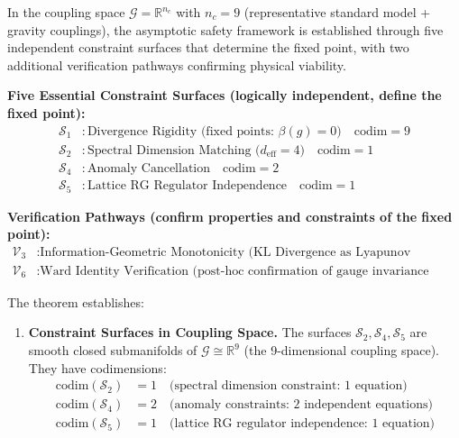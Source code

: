 \begin{theorem}
\label{thm:transversalityCompleteSixSurfaces}

In the coupling space $\mathcal{G} = \mathbb{R}^{n_c}$ with $n_c = 9$ (representative standard model + gravity couplings), the asymptotic safety framework is established through five independent constraint surfaces that determine the fixed point, with two additional verification pathways confirming physical viability.

\textbf{Five Essential Constraint Surfaces (logically independent, define the fixed point):}
\begin{align}
\mathcal{S}_1 &: \text{Divergence Rigidity (fixed points: } \beta(g) = 0\text{)} \quad \text{codim} = 9\\
\mathcal{S}_2 &: \text{Spectral Dimension Matching (} d_{\text{eff}} = 4\text{)} \quad \text{codim} = 1\\
\mathcal{S}_4 &: \text{Anomaly Cancellation} \quad \text{codim} = 2\\
\mathcal{S}_5 &: \text{Lattice RG Regulator Independence} \quad \text{codim} = 1
\end{align}

\textbf{Verification Pathways (confirm properties and constraints of the fixed point):}
\begin{align}
\mathcal{V}_3 &: \text{Information-Geometric Monotonicity (KL Divergence as Lyapunov function)}\\
\mathcal{V}_6 &: \text{Ward Identity Verification (post-hoc confirmation of gauge invariance preservation)}
\end{align}

The theorem establishes:

\begin{enumerate}

\item \textbf{Constraint Surfaces in Coupling Space.} The surfaces $\mathcal{S}_2, \mathcal{S}_4, \mathcal{S}_5$ are smooth closed submanifolds of $\mathcal{G} \cong \mathbb{R}^9$ (the 9-dimensional coupling space). They have codimensions:
\begin{align}
\text{codim}(\mathcal{S}_2) &= 1 \quad \text{(spectral dimension constraint: 1 equation)} \\
\text{codim}(\mathcal{S}_4) &= 2 \quad \text{(anomaly constraints: 2 independent equations)} \\
\text{codim}(\mathcal{S}_5) &= 1 \quad \text{(lattice RG regulator independence: 1 equation)}
\end{align}


\end{enumerate}
\end{theorem}
